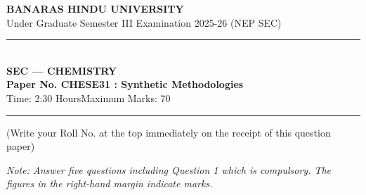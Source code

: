 \documentclass[11pt,a4paper]{article}
\begin{document}
\begin{center}
  {\large\bfseries BANARAS HINDU UNIVERSITY}\\[2pt]
  {\normalsize Under Graduate Semester III Examination 2025-26 (NEP SEC)}\\[6pt]
  \rule{0.8\linewidth}{0.5pt}\\[6pt]
  {\large\bfseries SEC --- CHEMISTRY}\\[4pt]
  {\large\bfseries Paper No. CHESE31 : Synthetic Methodologies}\\[4pt]
  {\normalsize Time: 2:30 Hours\hfill Maximum Marks: 70}
\end{center}

\rule{\linewidth}{0.4pt}

\smallskip



\noindent (Write your Roll No. at the top immediately on the receipt of this question paper)

\smallskip



\noindent   \textit{Note: Answer five questions including Question 1 which is compulsory. The figures in the right-hand margin indicate marks.}

\bigskip
\end{document}
